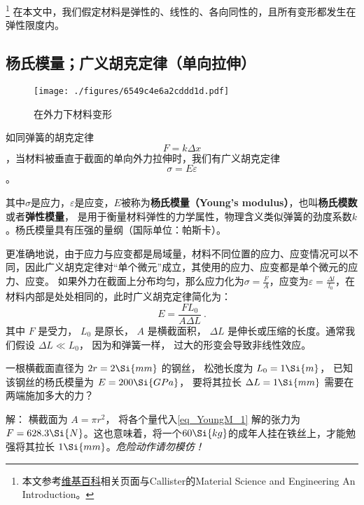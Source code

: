 
\begin{issues}
\issueDraft
\end{issues}

\footnote{本文参考\href{https://en.wikipedia.org/wiki/Young's_modulus}{维基百科}相关页面与Callister的Material Science and Engineering An Introduction。}
在本文中，我们假定材料是弹性的、线性的、各向同性的，且所有变形都发生在弹性限度内。

\subsection{杨氏模量；广义胡克定律（单向拉伸）}
\begin{figure}[ht]
\centering
\texttt{[image: ./figures/6549c4e6a2cddd1d.pdf]}
\caption{在外力下材料变形} \label{fig_YoungM_1}
\end{figure}

如同弹簧的胡克定律$$F=k \Delta x$$，当材料被垂直于截面的单向外力拉伸时，我们有广义胡克定律
\begin{equation}
\sigma = E \varepsilon
\end{equation}。

其中$\sigma$是应力，$\varepsilon$是应变，$E$被称为\textbf{杨氏模量（Young's modulus）}，也叫\textbf{杨氏模数}或者\textbf{弹性模量}， 是用于衡量材料弹性的力学属性，物理含义类似弹簧的劲度系数$k$。杨氏模量具有压强的量纲（国际单位：帕斯卡）。

更准确地说，由于应力与应变都是局域量，材料不同位置的应力、应变情况可以不同，因此广义胡克定律对“单个微元”成立，其使用的应力、应变都是单个微元的应力、应变。%
如果外力在截面上分布均匀，那么应力化为$\sigma=\frac{F}{A}$，应变为$\varepsilon=\frac{\Delta l}{l_0}$，在材料内部是处处相同的，此时广义胡克定律简化为：%
\begin{equation}\label{eq_YoungM_1}
E = \frac{FL_0}{A\Delta L}~.
\end{equation}
其中 $F$ 是受力， $L_0$ 是原长， $A$ 是横截面积， $\Delta L$ 是伸长或压缩的长度。通常我们假设 $\Delta L \ll L_0$， 因为和弹簧一样， 过大的形变会导致非线性效应。

\begin{example}{}
一根横截面直径为 $2r = 2\Si{mm}$ 的钢丝， 松弛长度为 $L_0 = 1\Si{m}$， 已知该钢丝的杨氏模量为 $E = 200\Si{GPa}$， 要将其拉长 $\Delta L = 1\Si{mm}$ 需要在两端施加多大的力？

解： 横截面为 $A = \pi r^2$， 将各个量代入\autoref{eq_YoungM_1} 解的张力为 $F = 628.3\Si{N}$。这也意味着，将一个$60 \Si{kg}$的成年人挂在铁丝上，才能勉强将其拉长 $1\Si{mm}$。\textsl{危险动作请勿模仿！}
\end{example}

